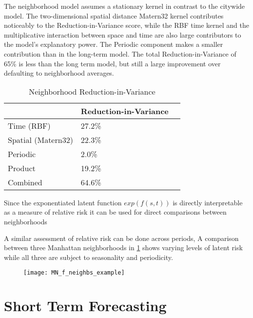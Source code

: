   The neighborhood model assumes a stationary kernel in contrast to the citywide model. The two-dimensional spatial distance Matern32 kernel contributes noticeably to the Reduction-in-Variance score, while the RBF time kernel and the multiplicative interaction between space and time are also large contributors to the model's explanatory power. The Periodic component makes a smaller contribution than in the long-term model. The total Reduction-in-Variance of 65\% is less than the long term model, but still a large improvement over defaulting to neighborhood averages. \par

  \begin{table}[]
  \centering
  \caption{Neighborhood Reduction-in-Variance}
  \label{variance_neighb}
  \begin{tabular}{@{}lll@{}}
  \toprule
                     & Reduction-in-Variance &  \\ \midrule
  Time (RBF)         & 27.2\%                &  \\
  Spatial (Matern32) & 22.3\%                &  \\
  Periodic           & 2.0\%                 &  \\
  Product            & 19.2\%                &  \\
  Combined           & 64.6\%                &  \\ \bottomrule
  \end{tabular}
  \end{table}



Since the exponentiated latent function $exp(f(s,t))$ is directly interpretable as a measure of relative risk it can be used for direct comparisons between neighborhoods \par


A similar assessment of relative risk can be done across periods, A comparison between three Manhattan neighborhoods in \ref{MN_f_neighbs_example} shows varying levels of latent risk while all three are subject to seasonality and periodicity.

\begin{figure}[h!]
  \centering
  \caption{}
  \label{MN_f_neighbs_example}
  \texttt{[image: MN\_f\_neighbs\_example]}
\end{figure}



\section{Short Term Forecasting}

